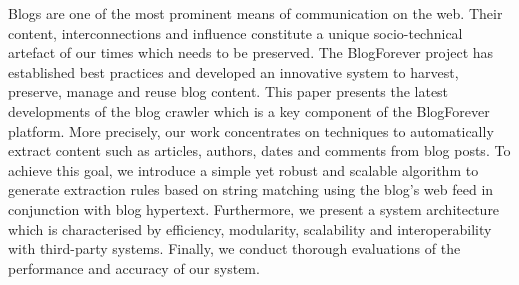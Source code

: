 
Blogs are one of the most prominent means of communication on the web. 
Their content, interconnections and influence constitute a unique 
socio-technical artefact of our times which needs to be preserved. 
The BlogForever project has established best practices and developed an 
innovative system to harvest, preserve, manage and reuse blog content. 
This paper presents the latest developments of the blog crawler which 
is a key component of the BlogForever platform. More precisely, our 
work concentrates on techniques to automatically extract content such 
as articles, authors, dates and comments from blog posts. To achieve 
this goal, we introduce a simple yet robust and scalable algorithm to 
generate extraction rules based on string matching using the blog's 
web feed in conjunction with blog hypertext. Furthermore, we present a 
system architecture which is characterised by efficiency, modularity, 
scalability and interoperability with third-party systems. Finally, 
we conduct thorough evaluations of the performance and accuracy of
our system.

